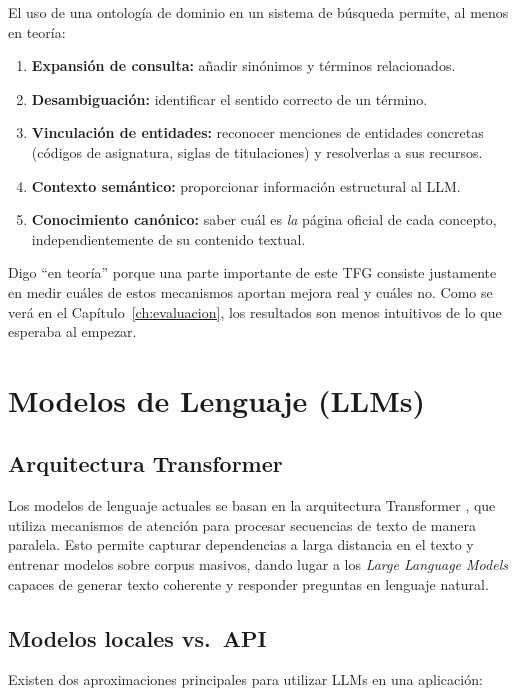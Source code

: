 \documentclass[12pt, a4paper, twoside]{report}
\begin{document}
El uso de una ontolog\'ia de dominio en un sistema de b\'usqueda permite, al menos en teor\'ia:

\begin{enumerate}
  \item \textbf{Expansi\'on de consulta:} a\~nadir sin\'onimos y t\'erminos relacionados.
  \item \textbf{Desambiguaci\'on:} identificar el sentido correcto de un t\'ermino.
  \item \textbf{Vinculaci\'on de entidades:} reconocer menciones de entidades concretas (c\'odigos de asignatura, siglas de titulaciones) y resolverlas a sus recursos.
  \item \textbf{Contexto sem\'antico:} proporcionar informaci\'on estructural al LLM.
  \item \textbf{Conocimiento can\'onico:} saber cu\'al es \textit{la} p\'agina oficial de cada concepto, independientemente de su contenido textual.
\end{enumerate}

Digo ``en teor\'ia'' porque una parte importante de este TFG consiste justamente en medir cu\'ales de estos mecanismos aportan mejora real y cu\'ales no. Como se ver\'a en el Cap\'itulo~\ref{ch:evaluacion}, los resultados son menos intuitivos de lo que esperaba al empezar.

\section{Modelos de Lenguaje (LLMs)}

\subsection{Arquitectura Transformer}

Los modelos de lenguaje actuales se basan en la arquitectura Transformer \cite{vaswani2017}, que utiliza mecanismos de atenci\'on para procesar secuencias de texto de manera paralela. Esto permite capturar dependencias a larga distancia en el texto y entrenar modelos sobre corpus masivos, dando lugar a los \textit{Large Language Models} capaces de generar texto coherente y responder preguntas en lenguaje natural.

\subsection{Modelos locales vs.\ API}

Existen dos aproximaciones principales para utilizar LLMs en una aplicaci\'on:
\end{document}
